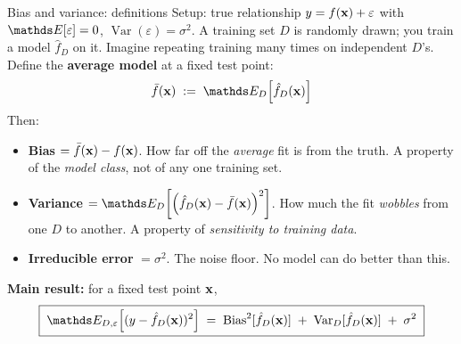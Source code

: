 \documentclass[aspectratio=169]{beamer}
\newcommand{\Var}{\operatorname{Var}}
\newcommand{\Bias}{\operatorname{Bias}}
\newcommand{\fbar}{\bar{f}}
\newcommand{\fD}{\hat{f}_D}
\newcommand{\fDx}{\hat{f}_D(\xv)}
\begin{document}
\begin{frame}{Bias and variance: definitions}
  Setup: true relationship $y = f(\mathbf{x}) + \varepsilon$ with $\E[\varepsilon] = 0$, $\Var(\varepsilon) = \sigma^2$. A training set $D$ is randomly drawn; you train a model $\fD$ on it.
  \vfill
  Imagine repeating training many times on independent $D$'s. Define the \textbf{average model} at a fixed test point:
  \[
    \fbar(\xv) \;:=\; \E_D\!\left[\fDx\right]
  \]
  Then:
  \begin{itemize}
    \item \textbf{Bias} $= \fbar(\xv) - f(\xv)$. How far off the \emph{average} fit is from the truth. A property of the \emph{model class}, not of any one training set.
    \item \textbf{Variance} $= \E_D\!\left[\left(\fDx - \fbar(\xv)\right)^2\right]$. How much the fit \emph{wobbles} from one $D$ to another. A property of \emph{sensitivity to training data}.
    \item \textbf{Irreducible error} $= \sigma^2$. The noise floor. No model can do better than this.
  \end{itemize}
  \vfill
  \textbf{Main result:} for a fixed test point $\mathbf{x}$,
  \[
    \boxed{\;\E_{D,\varepsilon}\!\left[(y - \fDx)^2\right] \;=\; \Bias^2[\fDx] \;+\; \Var_D[\fDx] \;+\; \sigma^2\;}
  \]
\end{frame}
\end{document}
